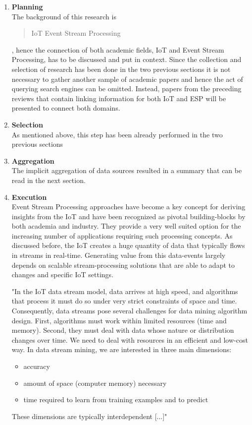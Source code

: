 \begin{enumerate}
    \item
    \textbf{Planning}\\
    The background of this research is \blockquote{IoT Event Stream Processing}, hence the connection of both academic fields, IoT and Event Stream Processing, has to be discussed and put in context. Since the collection and selection of research has been done in the two previous sections it is not necessary to gather another sample of academic papers and hence the act of querying search engines can be omitted. Instead, papers from the preceding reviews that contain linking information for both IoT and ESP will be presented to connect both domains.
    
    \item
    \textbf{Selection}\\
    As mentioned above, this step has been already performed in the two previous sections
    
    \item
    \textbf{Aggregation}\\
    The implicit aggregation of data sources resulted in a summary that can be read in the next section.
    
    \item
    \textbf{Execution}\\
    Event Stream Processing approaches have become a key concept for deriving insights from the \ac{IoT} and have been recognized as pivotal building-blocks by both academia and industry. They provide a very well suited option for the increasing number of applications requiring such processing concepts. As discussed before, the \ac{IoT} creates a huge quantity of data that typically flows in streams in real-time. Generating value from this data-events largely depends on scalable stream-processing solutions that are able to adapt to changes and specific IoT settings.
    
    \begin{displayquote}
        "In the IoT data stream model, data arrives at high speed,
        and algorithms that process it must do so under very strict
        constraints of space and time. Consequently, data streams
        pose several challenges for data mining algorithm design.
        First, algorithms must work within limited resources (time
        and memory). Second, they must deal with data whose nature
        or distribution changes over time. We need to deal with
        resources in an efficient and low-cost way. In data stream
        mining, we are interested in three main dimensions:
        \begin{itemize}[nolistsep]
            \item accuracy
            \item amount of space (computer memory) necessary
            \item time required to learn from training examples and to predict
        \end{itemize}
        These dimensions are typically interdependent [...]"\autocite{DeFrancisciMorales2016IoTMining}
    \end{displayquote}
    

\end{enumerate}
